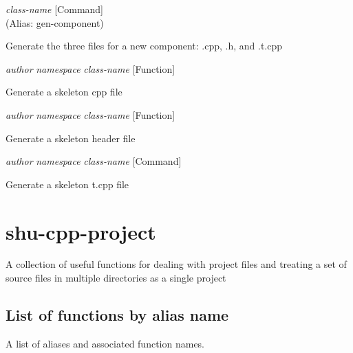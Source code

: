 \vspace{1em}
\noindent
{}
\usebox{\funcname}\emph{class-name}
 \hfill [Command]\\%
 (Alias: gen-component)

\begin{doc-string}
Generate the three files for a new component: .cpp, .h, and .t.cpp
\end{doc-string}

\vspace{1em}
\noindent
{}
\usebox{\funcname}\emph{author} \emph{namespace} \emph{class-name}
 \hfill [Function]

\begin{doc-string}
Generate a skeleton cpp file
\end{doc-string}

\vspace{1em}
\noindent
{}
\usebox{\funcname}\emph{author} \emph{namespace} \emph{class-name}
 \hfill [Function]

\begin{doc-string}
Generate a skeleton header file
\end{doc-string}

\vspace{1em}
\noindent
{}
\usebox{\funcname}\emph{author} \emph{namespace} \emph{class-name}
 \hfill [Command]

\begin{doc-string}
Generate a skeleton t.cpp file
\end{doc-string}

\eject
\section{shu-cpp-project}


A collection of useful functions for dealing with project files and treating
a set of source files in multiple directories as a single project


\subsection{List of functions by alias name}

A list of aliases and associated function names.



